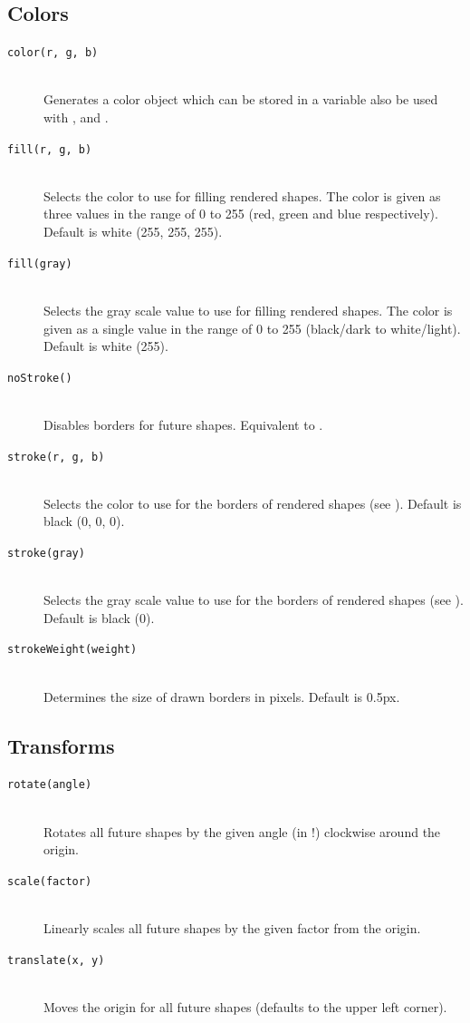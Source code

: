\subsection{Colors}
\begin{description}
\item[\texttt{color(r, g, b)}] \hfill \\
	Generates a color object which can be stored in a variable also be used with ,  and .
\item[\texttt{fill(r, g, b)}] \hfill \\
	Selects the color to use for filling rendered shapes. The color is given as three values in the range of 0 to 255 (red, green and blue respectively). Default is white (255, 255, 255).
\item[\texttt{fill(gray)}] \hfill \\
	Selects the gray scale value to use for filling rendered shapes. The color is given as a single value in the range of 0 to 255 (black/dark to white/light). Default is white (255).
\item[\texttt{noStroke()}] \hfill \\
	Disables borders for future shapes. Equivalent to .
\item[\texttt{stroke(r, g, b)}] \hfill \\
	Selects the color to use for the borders of rendered shapes (see ). Default is black (0, 0, 0).
\item[\texttt{stroke(gray)}] \hfill \\
	Selects the gray scale value to use for the borders of rendered shapes (see ). Default is black (0).
\item[\texttt{strokeWeight(weight)}] \hfill \\
	Determines the size of drawn borders in pixels. Default is 0.5px.
\end{description}

\subsection{Transforms}
\begin{description}
\item[\texttt{rotate(angle)}] \hfill \\
	Rotates all future shapes by the given angle (in !) clockwise around the origin.
\item[\texttt{scale(factor)}] \hfill \\
	Linearly scales all future shapes by the given factor from the origin.
\item[\texttt{translate(x, y)}] \hfill \\
	Moves the origin  for all future shapes (defaults to the upper left corner).
\end{description}

